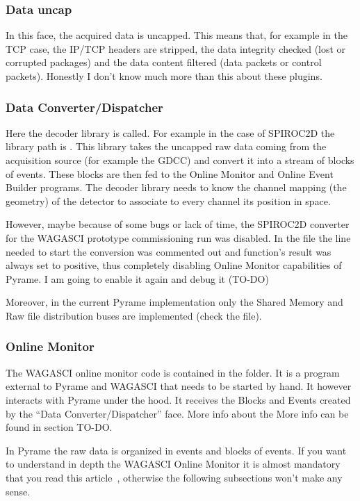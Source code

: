 \subsubsection{Data uncap}
In this face, the acquired data is uncapped. This means that, for example in the
TCP case, the IP/TCP headers are stripped, the data integrity checked (lost or
corrupted packages) and the data content filtered (data packets or control
packets). Honestly I don't know much more than this about these plugins.

\subsubsection{Data Converter/Dispatcher}
Here the decoder library is called. For example in the case of SPIROC2D the
library path is . This library takes the
uncapped raw data coming from the acquisition source (for example the GDCC) and
convert it into a stream of blocks of events. These blocks are then fed to the
Online Monitor and Online Event Builder programs.  The decoder library needs to
know the channel mapping (the geometry) of the detector to associate to every
channel its position in space.

However, maybe because of some bugs or lack of time, the SPIROC2D converter for
the WAGASCI prototype commissioning run was disabled. In the
 file the line needed to start the conversion was
commented out and function's result was always set to positive, thus completely
disabling Online Monitor capabilities of Pyrame. I am going to enable it again
and debug it (TO-DO)

Moreover, in the current Pyrame implementation only the Shared Memory and Raw
file distribution buses are implemented (check the 
file).

\subsubsection{Online Monitor}
The WAGASCI online monitor code is contained in the
 folder. It is a program external to Pyrame
and WAGASCI that needs to be started by hand. It however interacts with Pyrame
under the hood. It receives the Blocks and Events created by the ``Data
Converter/Dispatcher'' face. More info about the More info can be found in
section TO-DO.\@

In Pyrame the raw data is organized in events and blocks of events. If you want
to understand in depth the WAGASCI Online Monitor it is almost mandatory that
you read this article~\cite{Rubio-Roy:2017nco}, otherwise the following
subsections won't make any sense.

